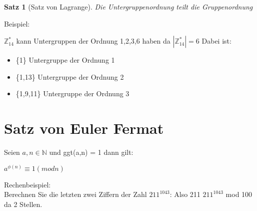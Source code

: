 \documentclass[12pt, letterpaper, twoside]{article}
\newtheorem{theorem}{Satz}[section]
\begin{document}
\begin{theorem}[Satz von Lagrange] Die Untergruppenordnung teilt die Gruppenordnung\end{theorem}

Beispiel:

$\mathbb{Z}_{14}^* $ kann Untergruppen der Ordnung 1,2,3,6 haben da $ |\mathbb{Z}_{14}^*| = 6 $
Dabei ist:
\begin{itemize}
	\item \{1\} Untergruppe der Ordnung  1
	\item \{1,13\} Untergruppe der Ordnung 2
	\item \{1,9,11\} Untergruppe der Ordnung 3
\end{itemize}




\section{Satz von Euler Fermat}
Seien $ a,n \in  \mathbb{N} $ und ggt(a,n) = 1 dann gilt: \\
\begin{center}
$ a^{\phi (n)} \equiv 1 (mod n) $ \\
\end{center}
Rechenbeispiel: \\
Berechnen Sie die letzten zwei Ziffern der Zahl $ 211^{1043} $:
Also 211 $ 211^{1043} $ mod 100 da 2 Stellen.
\end{document}
